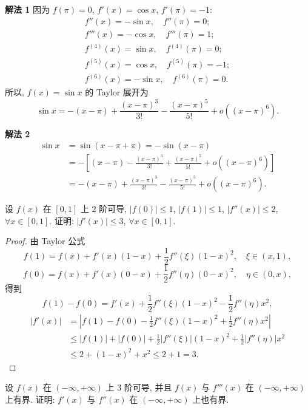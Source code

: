 \begin{solution}
\textbf{解法 1} 因为 $f(\pi)=0$, $f'(x)=\cos x$, $f'(\pi)=-1$:
\begin{gather*}
f''(x)=-\sin x,\quad f''(\pi)=0;\\
f'''(x)=-\cos x,\quad f'''(\pi)=1;\\
f^{(4)}(x)=\sin x,\quad f^{(4)}(\pi)=0;\\
f^{(5)}(x)=\cos x,\quad f^{(5)}(\pi)=-1;\\
f^{(6)}(x)=-\sin x,\quad f^{(6)}(\pi)=0.
\end{gather*}
所以, $f(x)=\sin x$ 的 Taylor 展开为
\[
\sin x=-(x-\pi)+\frac{(x-\pi)^{3}}{3!}-\frac{(x-\pi)^{5}}{5!}+o((x-\pi)^{6}).
\]

\textbf{解法 2}
\begin{align*}
\sin x&=\sin(x-\pi+\pi)=-\sin(x-\pi)\\
&=-\left[(x-\pi)-\frac{(x-\pi)^{3}}{3!}+\frac{(x-\pi)^{5}}{5!}+o((x-\pi)^{6})\right]\\
&=-(x-\pi)+\frac{(x-\pi)^{3}}{3!}-\frac{(x-\pi)^{5}}{5!}+o((x-\pi)^{6}).
\end{align*}
\end{solution}

\begin{example}\label{ex:4.1.14}
设 $f(x)$ 在 $[0,1]$ 上 $2$ 阶可导, $|f(0)|\leqslant 1$, $|f(1)|\leqslant 1$, $|f''(x)|\leqslant 2$, $\forall x\in[0,1]$. 证明: $|f'(x)|\leqslant 3$, $\forall x\in[0,1]$.
\end{example}

\begin{proof}
由 Taylor 公式
\[
f(1)=f(x)+f'(x)(1-x)+\frac{1}{2}f''(\xi)(1-x)^{2},\quad \xi\in(x,1),
\]
\[
f(0)=f(x)+f'(x)(0-x)+\frac{1}{2}f''(\eta)(0-x)^{2},\quad \eta\in(0,x),
\]
得到
\[
f(1)-f(0)=f'(x)+\frac{1}{2}f''(\xi)(1-x)^{2}-\frac{1}{2}f''(\eta)x^{2},
\]
\begin{align*}
|f'(x)|&=\left|f(1)-f(0)-\frac{1}{2}f''(\xi)(1-x)^{2}+\frac{1}{2}f''(\eta)x^{2}\right|\\
&\leqslant |f(1)|+|f(0)|+\frac{1}{2}|f''(\xi)|(1-x)^{2}+\frac{1}{2}|f''(\eta)|x^{2}\\
&\leqslant 2+(1-x)^{2}+x^{2}\leqslant 2+1=3.
\end{align*}
\end{proof}

\begin{example}\label{ex:4.1.15}
设 $f(x)$ 在 $(-\infty,+\infty)$ 上 $3$ 阶可导, 并且 $f(x)$ 与 $f'''(x)$ 在 $(-\infty,+\infty)$ 上有界. 证明: $f'(x)$ 与 $f''(x)$ 在 $(-\infty,+\infty)$ 上也有界.
\end{example}

